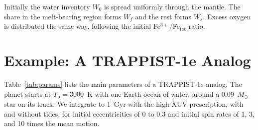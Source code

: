 \documentclass[11pt]{article}
\newcommand{\Tp}{T_\mathrm{p}}
\begin{document}
Initially the water inventory $W_0$ is spread uniformly through the mantle. The share in the melt-bearing region forms $W_f$ and the rest forms $W_s$. Excess oxygen is distributed the same way, following the initial Fe$^{3+}$/Fe$_\mathrm{tot}$ ratio.

\section{Example: A TRAPPIST-1e Analog}\label{sec:example}

Table~\ref{tab:params} lists the main parameters of a TRAPPIST-1e analog. The planet starts at $\Tp = 3000$~K with one Earth ocean of water, around a 0.09~$M_\odot$ star on its \citet{Baraffe2015} track. We integrate to 1~Gyr with the high-XUV prescription, with and without tides, for initial eccentricities of 0 to 0.3 and initial spin rates of 1, 3, and 10 times the mean motion.
\end{document}
